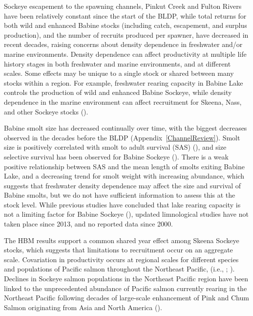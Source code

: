 \documentclass[french,11pt]{book}
\begin{document}
Sockeye escapement to the spawning channels, Pinkut Creek and Fulton Rivers have been relatively constant since the start of the BLDP, while total returns for both wild and enhanced Babine stocks (including catch, escapement, and surplus production), and the number of recruits produced per spawner, have decreased in recent decades, raising concerns about density dependence in freshwater and/or marine environments. Density dependence can affect productivity at multiple life history stages in both freshwater and marine environments, and at different scales. Some effects may be unique to a single stock or shared between many stocks within a region. For example, freshwater rearing capacity in Babine Lake controls the production of wild and enhanced Babine Sockeye, while density dependence in the marine environment can affect recruitment for Skeena, Nass, and other Sockeye stocks ().

Babine smolt size has decreased continually over time, with the biggest decreases observed in the decades before the BLDP (Appendix~\ref{ChannelReview}). Smolt size is positively correlated with smolt to adult survival (SAS) (), and size selective survival has been observed for Babine Sockeye (). There is a weak positive relationship between SAS and the mean length of smolts exiting Babine Lake, and a decreasing trend for smolt weight with increasing abundance, which suggests that freshwater density dependence may affect the size and survival of Babine smolts, but we do not have sufficient information to assess this at the stock level. While previous studies have concluded that lake rearing capacity is not a limiting factor for Babine Sockeye (), updated limnological studies have not taken place since 2013, and no reported data since 2000.

The HBM results support a common shared year effect among Skeena Sockeye stocks, which suggests that limitations to recruitment occur on an aggregate scale. Covariation in productivity occurs at regional scales for different species and populations of Pacific salmon throughout the Northeast Pacific, (i.e., ; ). Declines in Sockeye salmon populations in the Northeast Pacific region have been linked to the unprecedented abundance of Pacific salmon currently rearing in the Northeast Pacific following decades of large-scale enhancement of Pink and Chum Salmon originating from Asia and North America ().
\end{document}

